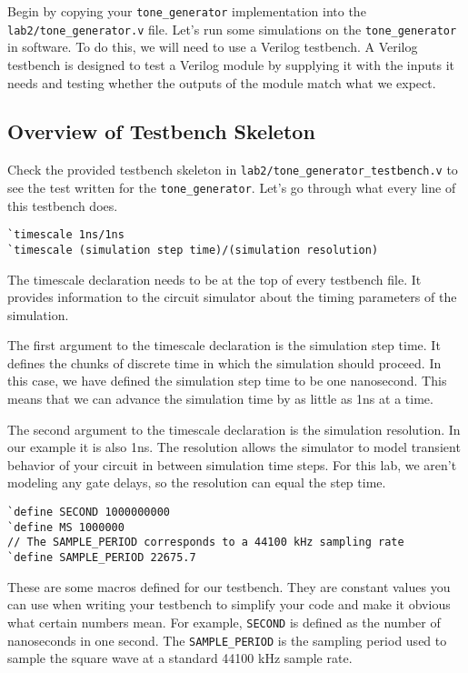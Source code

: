 \documentclass[11pt]{article}
\begin{document}
Begin by copying your \verb|tone_generator| implementation into the \verb|lab2/tone_generator.v| file. Let's run some simulations on the \verb|tone_generator| in software. To do this, we will need to use a Verilog testbench. A Verilog testbench is designed to test a Verilog module by supplying it with the inputs it needs and testing whether the outputs of the module match what we expect.


\subsection{Overview of Testbench Skeleton}
Check the provided testbench skeleton in \verb|lab2/tone_generator_testbench.v| to see the test written for the \verb|tone_generator|. Let's go through what every line of this testbench does.

\begin{verbatim}
`timescale 1ns/1ns
`timescale (simulation step time)/(simulation resolution)
\end{verbatim}

The timescale declaration needs to be at the top of every testbench file. It provides information to the circuit simulator about the timing parameters of the simulation.

The first argument to the timescale declaration is the simulation step time. It defines the chunks of discrete time in which the simulation should proceed. In this case, we have defined the simulation step time to be one nanosecond. This means that we can advance the simulation time by as little as 1ns at a time.

The second argument to the timescale declaration is the simulation resolution. In our example it is also 1ns. The resolution allows the simulator to model transient behavior of your circuit in between simulation time steps. For this lab, we aren't modeling any gate delays, so the resolution can equal the step time.

\begin{verbatim}
`define SECOND 1000000000
`define MS 1000000
// The SAMPLE_PERIOD corresponds to a 44100 kHz sampling rate
`define SAMPLE_PERIOD 22675.7
\end{verbatim}

These are some macros defined for our testbench. They are constant values you can use when writing your testbench to simplify your code and make it obvious what certain numbers mean. For example, \verb|SECOND| is defined as the number of nanoseconds in one second. The \verb|SAMPLE_PERIOD| is the sampling period used to sample the square wave at a standard 44100 kHz sample rate.
\end{document}
